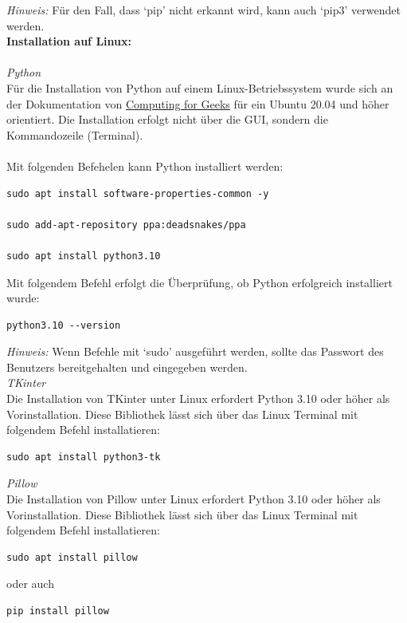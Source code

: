 \documentclass{Bild-Metadaten-Analyzer}
\begin{document}
\textit{Hinweis:} Für den Fall, dass `pip' nicht erkannt wird, kann auch `pip3' verwendet werden.\\

\textbf{Installation auf Linux:}\\
\\\textit{Python}\\
Für die Installation von Python auf einem Linux-Betriebssystem wurde sich an der Dokumentation von 
\href{https://computingforgeeks.com/how-to-install-python-on-ubuntu-linux-system/}{Computing for Geeks} für ein Ubuntu 20.04 und 
höher orientiert. Die Installation erfolgt nicht über die GUI, sondern die Kommandozeile (Terminal).\\
\\Mit folgenden Befehelen kann Python installiert werden:

\begin{lstlisting}[style=pythonstyle]
sudo apt install software-properties-common -y

sudo add-apt-repository ppa:deadsnakes/ppa

sudo apt install python3.10
\end{lstlisting}

Mit folgendem Befehl erfolgt die Überprüfung, ob Python erfolgreich installiert wurde:
\begin{lstlisting}[style=pythonstyle]
python3.10 --version
\end{lstlisting}
\textit{Hinweis:} Wenn Befehle mit `sudo' ausgeführt werden, sollte das Passwort des Benutzers bereitgehalten und eingegeben werden.\\

\textit{TKinter}\\
Die Installation von TKinter unter Linux erfordert Python 3.10 oder höher als Vorinstallation. Diese Bibliothek lässt sich über 
das Linux Terminal mit folgendem Befehl installatieren:
\begin{lstlisting}[style=pythonstyle]
sudo apt install python3-tk
\end{lstlisting}

\textit{Pillow}\\
Die Installation von Pillow unter Linux erfordert Python 3.10 oder höher als Vorinstallation. Diese Bibliothek lässt sich über 
das Linux Terminal mit folgendem Befehl installatieren:
\begin{lstlisting}[style=pythonstyle]
sudo apt install pillow
\end{lstlisting}
oder auch \\
\begin{lstlisting}[style=pythonstyle]
pip install pillow
\end{lstlisting}
\end{document}

